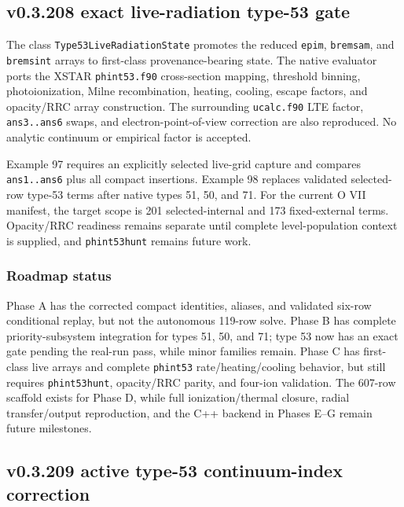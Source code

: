 \documentclass[
  10pt,
]{article}
\begin{document}
\subsection{v0.3.208 exact live-radiation type-53 gate}

The class \texttt{Type53LiveRadiationState} promotes the reduced \texttt{epim}, \texttt{bremsam}, and \texttt{bremsint} arrays to first-class provenance-bearing state. The native evaluator ports the XSTAR \texttt{phint53.f90} cross-section mapping, threshold binning, photoionization, Milne recombination, heating, cooling, escape factors, and opacity/RRC array construction. The surrounding \texttt{ucalc.f90} LTE factor, \texttt{ans3..ans6} swaps, and electron-point-of-view correction are also reproduced. No analytic continuum or empirical factor is accepted.

Example 97 requires an explicitly selected live-grid capture and compares \texttt{ans1..ans6} plus all compact insertions. Example 98 replaces validated selected-row type-53 terms after native types 51, 50, and 71. For the current O VII manifest, the target scope is 201 selected-internal and 173 fixed-external terms. Opacity/RRC readiness remains separate until complete level-population context is supplied, and \texttt{phint53hunt} remains future work.

\subsubsection{Roadmap status}

Phase A has the corrected compact identities, aliases, and validated six-row conditional replay, but not the autonomous 119-row solve. Phase B has complete priority-subsystem integration for types 51, 50, and 71; type 53 now has an exact gate pending the real-run pass, while minor families remain. Phase C has first-class live arrays and complete \texttt{phint53} rate/heating/cooling behavior, but still requires \texttt{phint53hunt}, opacity/RRC parity, and four-ion validation. The 607-row scaffold exists for Phase D, while full ionization/thermal closure, radial transfer/output reproduction, and the C++ backend in Phases E--G remain future milestones.

\subsection{v0.3.209 active type-53 continuum-index correction}
\end{document}
